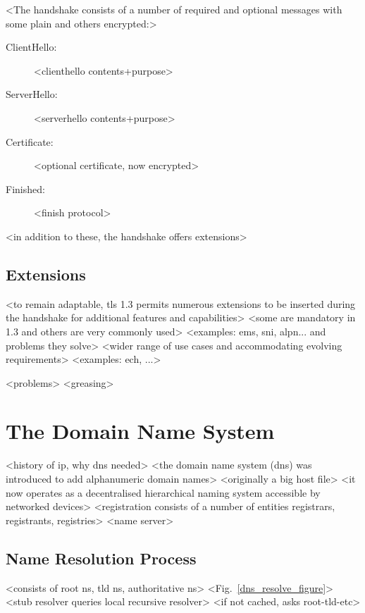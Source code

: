 <The handshake consists of a number of required and optional messages with some plain and others encrypted:>

\begin{description}
\item[ClientHello:] <clienthello contents+purpose>
\item[ServerHello:] <serverhello contents+purpose>
\item[Certificate:] <optional certificate, now encrypted>
\item[Finished:] <finish protocol>
\end{description}

<in addition to these, the handshake offers extensions>

\subsection{Extensions}

<to remain adaptable, tls 1.3 permits numerous extensions to be inserted during the handshake for additional features and capabilities>
<some are mandatory in 1.3 and others are very commonly used>
<examples: ems, sni, alpn... and problems they solve>
<wider range of use cases and accommodating evolving requirements>
<examples: ech, ...>

<problems>
<greasing>








\section{The Domain Name System}

<history of ip, why dns needed>
<the domain name system (dns) was introduced to add alphanumeric domain names>
<originally a big host file>
<it now operates as a decentralised hierarchical naming system accessible by networked devices>
<registration consists of a number of entities registrars, registrants, registries>
<name server>

\subsection{Name Resolution Process}

<consists of root ns, tld ns, authoritative ns>
<Fig.~\ref{dns_resolve_figure}>
<stub resolver queries local recursive resolver>
<if not cached, asks root-tld-etc>

